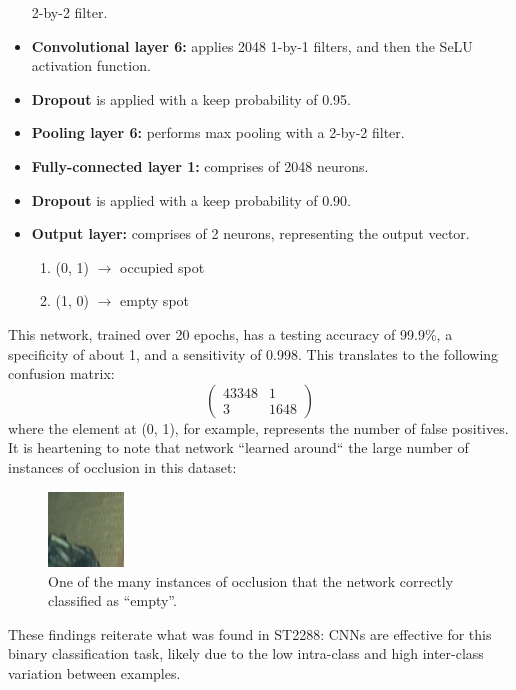 \documentclass[a4paper, 11pt]{article} %
\begin{document}
\begin{itemize}
			2-by-2 
			filter.
			\item[] \textbf{Convolutional layer 6:} applies 2048 1-by-1 
			filters, 
			and then 
			the SeLU activation function.
			\item[] \textbf{Dropout} is applied with a keep probability of 0.95.
			\item[] \textbf{Pooling layer 6:} performs max pooling with a 
			2-by-2 
			filter.
			\item[] \textbf{Fully-connected layer 1:} comprises of 2048 neurons.
			\item[] \textbf{Dropout} is applied with a keep probability of 0.90.
			\item[] \textbf{Output layer:} comprises of 2 neurons, representing 
			the 
			output 
			vector.
			\vspace*{-4mm}
			\begin{enumerate}
				\setlength\itemsep{-3mm}
				\item[] (0, 1) $\rightarrow$ occupied spot
				\item[] (1, 0) $\rightarrow$ empty spot
			\end{enumerate}
		\end{itemize}
		This network, trained over 20 epochs, has a testing accuracy of 99.9\%, 
		a specificity of about 1, and a
		sensitivity of 0.998. This translates to the following confusion matrix:
		\begin{equation}
		\nonumber
		\begin{pmatrix} 43348 & 1\\ 3 & 1648 \end{pmatrix}
		\end{equation}
		\newpage
		\hspace*{-6mm}where the element at (0, 1), for example, represents the 
		number of 
		false 
		positives. It is heartening to note that network ``learned around`` the 
		large number of instances of occlusion in this dataset:
		\begin{figure}[H]
			\centering
			\includegraphics[width=2cm]{figures/nuslot_occlusion}
			\caption{One of the many instances of occlusion that the network 
			correctly classified as ``empty''.}
		\end{figure}
		\hspace*{-6mm}These findings reiterate what was found in ST2288: CNNs 
		are 
		effective for 
		this binary classification task, likely due to the low intra-class 
		and high inter-class variation between examples.
\end{document}
